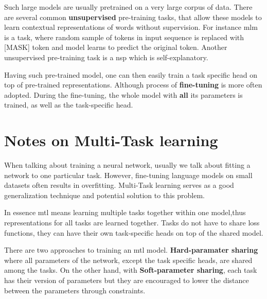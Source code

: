Such large models are usually pretrained on a very large corpus of data. There are several common \textbf{unsupervised} pre-training tasks, that allow these models to learn contextual representations of words without supervision. For instance \gls{mlm} is a task, where random sample of tokens in input sequence is replaced with [MASK] token and model learns to predict the original token. Another unsupervised pre-training task is a \gls{nsp} which is self-explanatory.

Having such pre-trained model, one can then easily train a task specific head on top of pre-trained representations. Although process of \textbf{fine-tuning} is more often adopted. During the fine-tuning, the whole model with \textbf{all} its parameters is trained, as well as the task-specific head.

\section{Notes on Multi-Task learning}
When talking about training a neural network, usually we talk about fitting a network to one particular task. However, fine-tuning language models on small datasets often results in overfitting. Multi-Task learning serves as a good generalization technique and potential solution to this problem.

In essence \gls{mtl} means learning multiple tasks together within one model,thus representations for all tasks are learned together. Tasks do not have to share loss functions, they can have their own task-specific heads on top of the shared model.

There are two approaches to training an \gls{mtl} model.
\textbf{Hard-paramater sharing} where all parameters of the network, except the task specific heads, are shared among the tasks. On the other hand, with \textbf{Soft-parameter sharing}, each task has their version of parameters but they are encouraged to lower the distance between the parameters through constraints.